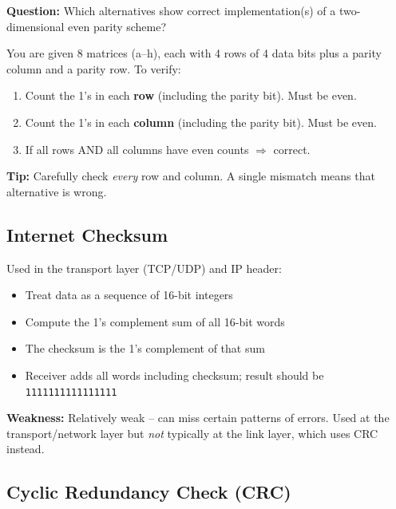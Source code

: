 \begin{exambox}
\textbf{Question:} Which alternatives show correct implementation(s) of a two-dimensional even parity scheme?

\medskip
You are given 8 matrices (a--h), each with 4 rows of 4 data bits plus a parity column and a parity row. To verify:
\begin{enumerate}[noitemsep]
    \item Count the 1's in each \textbf{row} (including the parity bit). Must be even.
    \item Count the 1's in each \textbf{column} (including the parity bit). Must be even.
    \item If all rows AND all columns have even counts $\Rightarrow$ correct.
\end{enumerate}

\textbf{Tip:} Carefully check \emph{every} row and column. A single mismatch means that alternative is wrong.
\end{exambox}

\subsection{Internet Checksum}

\begin{keybox}
Used in the transport layer (TCP/UDP) and IP header:
\begin{itemize}[noitemsep]
    \item Treat data as a sequence of 16-bit integers
    \item Compute the 1's complement sum of all 16-bit words
    \item The checksum is the 1's complement of that sum
    \item Receiver adds all words including checksum; result should be \texttt{1111111111111111}
\end{itemize}

\textbf{Weakness:} Relatively weak -- can miss certain patterns of errors. Used at the transport/network layer but \emph{not} typically at the link layer, which uses CRC instead.
\end{keybox}

\subsection{Cyclic Redundancy Check (CRC)}

